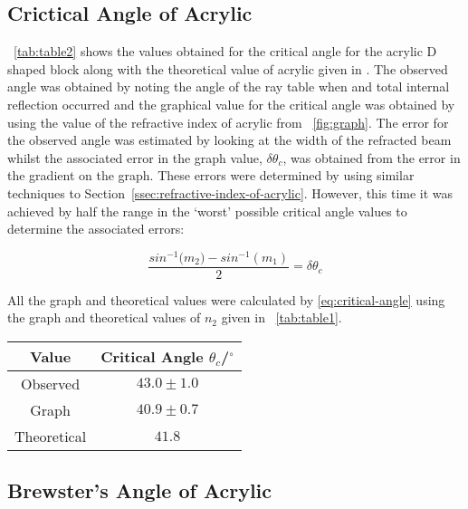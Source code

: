 \documentclass{article}
\newcommand{\figref}[2][\figurename~]{#1\ref{#2}}
\newcommand{\tabref}[2][\tablename~]{#1\ref{#2}}
\newcommand{\secref}[2][Section~]{#1\ref{#2}}
\begin{document}
\subsection{Crictical Angle of Acrylic}
\label{ssec:critical-angle}

\tabref{tab:table2} shows the values obtained for the critical angle for the acrylic D shaped block along with the theoretical value of acrylic given in \cite{Paper01}. The observed angle was obtained by noting the angle of the ray table when and total internal reflection occurred and the graphical value for the critical angle was obtained by using the value of the refractive index of acrylic from \figref{fig:graph}. The error for the observed angle was estimated by looking at the width of the refracted beam whilst the associated error in the graph value, $\delta{\theta_c}$, was obtained from the error in the gradient on the graph. These errors were determined by using similar techniques to \secref{ssec:refractive-index-of-acrylic}. However, this time it was achieved by half the range in the `worst' possible critical angle values to determine the associated errors:

\begin{equation}
\label{eq:gradient-error3}
\frac{sin^{-1}({m_{2})} - sin^{-1}({m_{1}})}{2} = \delta{\theta_c}
\end{equation} 

\vspace{2mm}
\noindent
All the graph and theoretical values were calculated by \eqref{eq:critical-angle} using the graph and theoretical values of $n_2$ given in \tabref{tab:table1}.

\vspace{5mm}
\begin{table*}[h]
\centering %
\caption{Table of Calculated Values and Published Values for the Critical Angle of Acrylic}
\label{tab:table2}
\begin{tabular}{|c|c|}
\hline
Value & Critical Angle $\theta_c$/$^{\circ}$ \\
\hline
Observed & $43.0 \pm 1.0$  \\
\hline
Graph & $40.9 \pm 0.7$ \\
\hline
Theoretical \cite{Paper01} & $41.8$ \\
\hline
\end{tabular}
\end{table*}

\subsection{Brewster's Angle of Acrylic}
\label{ssec:brewsters-angle}
\end{document}
